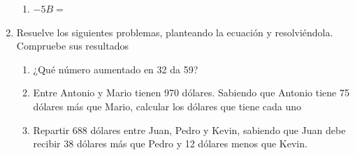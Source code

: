 \documentclass[fleqn]{article}
\begin{document}
\begin{enumerate}
\begin{enumerate}
   \item $-5B=$
  \end{enumerate}
  \item Resuelve los siguientes problemas, planteando la ecuación y resolviéndola. Compruebe sus resultados
  \begin{enumerate}
   \item ¿Qué número aumentado en 32 da 59?\noanswer
   \item Entre Antonio y Mario tienen 970 dólares. Sabiendo que Antonio tiene 75 dólares más que Mario, calcular los dólares que tiene cada uno\noanswer
   \item Repartir 688 dólares entre Juan, Pedro y Kevin, sabiendo que Juan debe recibir 38 dólares más que Pedro y 12 dólares menos que Kevin.
  \end{enumerate}
\end{enumerate}
\end{document}
